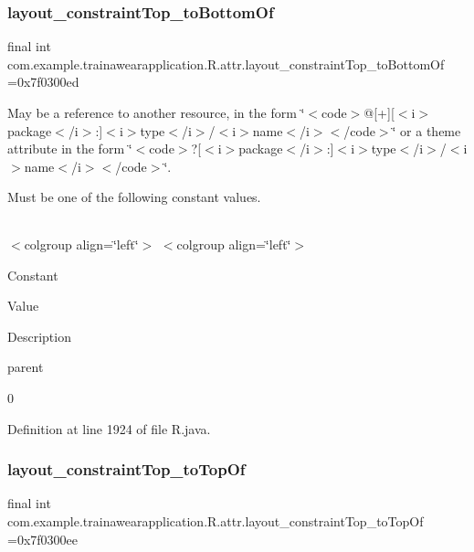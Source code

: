 \subsubsection{\texorpdfstring{layout\_constraintTop\_toBottomOf}{layout\_constraintTop\_toBottomOf}}
{\footnotesize\ttfamily final int com.\+example.\+trainawearapplication.\+R.\+attr.\+layout\+\_\+constraint\+Top\+\_\+to\+Bottom\+Of =0x7f0300ed\hspace{0.3cm}{\ttfamily [static]}}

May be a reference to another resource, in the form \char`\"{}$<$code$>$@\mbox{[}+\mbox{]}\mbox{[}$<$i$>$package$<$/i$>$\+:\mbox{]}$<$i$>$type$<$/i$>$/$<$i$>$name$<$/i$>$$<$/code$>$\char`\"{} or a theme attribute in the form \char`\"{}$<$code$>$?\mbox{[}$<$i$>$package$<$/i$>$\+:\mbox{]}$<$i$>$type$<$/i$>$/$<$i$>$name$<$/i$>$$<$/code$>$\char`\"{}. 

Must be one of the following constant values.

\tabulinesep=1mm
\begin{longtabu}spread 0pt [c]{*{0}{|X[-1]}|}
\hline
\end{longtabu}
$<$colgroup align=\char`\"{}left\char`\"{}$>$ $<$colgroup align=\char`\"{}left\char`\"{}$>$ 

Constant

Value

Description 

parent

0

Definition at line 1924 of file R.\+java.

\mbox{\label{classcom_1_1example_1_1trainawearapplication_1_1_r_1_1attr_a37fd90c107277bcbecb5838175b61fda}} 
\subsubsection{\texorpdfstring{layout\_constraintTop\_toTopOf}{layout\_constraintTop\_toTopOf}}
{\footnotesize\ttfamily final int com.\+example.\+trainawearapplication.\+R.\+attr.\+layout\+\_\+constraint\+Top\+\_\+to\+Top\+Of =0x7f0300ee\hspace{0.3cm}{\ttfamily [static]}}

